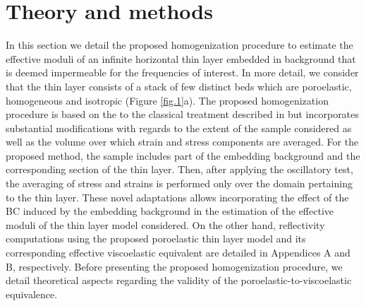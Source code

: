 \documentclass[draft]{agujournal2019}
\begin{document}


\section{Theory and methods}
In this section we detail the proposed homogenization procedure to estimate the effective moduli of an infinite horizontal thin layer embedded in background that is deemed impermeable for the frequencies of interest.  
In more detail, we consider that the thin layer consists of a stack of few distinct beds which are poroelastic, homogeneous and isotropic (Figure \ref{fig.1}a). 
The proposed homogenization procedure is based on the to the classical treatment described in  but incorporates substantial modifications with regards to
the extent of the sample considered as well as the volume over which strain and stress components are averaged. For the proposed method, the sample includes part of the embedding background and the corresponding section of the thin layer. Then, after applying the oscillatory test, the averaging of stress and strains is performed only over the domain pertaining to the thin layer.
 These novel adaptations allows
incorporating the effect of the BC induced by the embedding background in the estimation of the effective moduli of the thin layer model considered. 
On the other hand, reflectivity computations using the proposed poroelastic thin layer model  and its corresponding effective viscoelastic equivalent are detailed in Appendices A and B, respectively. Before presenting the proposed homogenization procedure,
we detail theoretical aspects regarding the validity of the poroelastic-to-viscoelastic equivalence.
\end{document}
